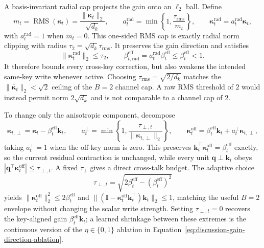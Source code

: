 \documentclass[11pt]{article}
\newcommand{\vct}[1]{\boldsymbol{#1}}
\begin{document}
A basis-invariant radial cap projects the gain onto an $\ell_2$ ball. Define
\begin{equation}
  m_t=\operatorname{RMS}(\vct{\kappa}_t)
     =\frac{\|\vct{\kappa}_t\|_2}{\sqrt{d_k}},
  \qquad
  a_t^{\mathrm{rad}}
     =\min\!\left\{1,\frac{\tau_{\mathrm{rms}}}{m_t}\right\},
  \qquad
  \vct{\kappa}_t^{\mathrm{rad}}
     =a_t^{\mathrm{rad}}\vct{\kappa}_t,
  \label{eq:discussion-radial-rms-cap}
\end{equation}
with $a_t^{\mathrm{rad}}=1$ when $m_t=0$. This one-sided RMS cap is exactly radial norm clipping
with radius $\tau_2=\sqrt{d_k}\tau_{\mathrm{rms}}$. It preserves the gain direction and satisfies
\begin{equation}
  \|\vct{\kappa}_t^{\mathrm{rad}}\|_2\leq\tau_2,
  \qquad
  \beta_{t,\mathrm{rad}}^{\mathrm{eff}}
    =a_t^{\mathrm{rad}}\beta_t^{\mathrm{eff}}
    \leq\beta_t^{\mathrm{eff}}<1.
  \label{eq:discussion-radial-rms-guarantees}
\end{equation}
It therefore bounds every cross-key correction, but also weakens the intended same-key write
whenever active. Choosing $\tau_{\mathrm{rms}}=\sqrt{2/d_k}$ matches the
$\|\overline{\vct{\kappa}}_t\|_2<\sqrt{2}$ ceiling of the $B=2$ channel cap. A raw RMS threshold
of $2$ would instead permit norm $2\sqrt{d_k}$ and is not comparable to a channel cap of $2$.

To change only the anisotropic component, decompose
\begin{equation}
  \vct{\kappa}_{t,\perp}
    =\vct{\kappa}_t-\beta_t^{\mathrm{eff}}\vct{k}_t,
  \qquad
  a_t^\perp
    =\min\!\left\{1,
      \frac{\tau_{\perp,t}}{\|\vct{\kappa}_{t,\perp}\|_2}\right\},
  \qquad
  \vct{\kappa}_t^{\mathrm{off}}
    =\beta_t^{\mathrm{eff}}\vct{k}_t
     +a_t^\perp\vct{\kappa}_{t,\perp},
  \label{eq:discussion-off-key-gain-cap}
\end{equation}
taking $a_t^\perp=1$ when the off-key norm is zero. This preserves
$\vct{k}_t^\top\vct{\kappa}_t^{\mathrm{off}}=\beta_t^{\mathrm{eff}}$ exactly, so the current
residual contraction is unchanged, while every unit
$\vct{q}\perp\vct{k}_t$ obeys
$|\vct{q}^\top\vct{\kappa}_t^{\mathrm{off}}|\leq\tau_{\perp,t}$.
A fixed $\tau_\perp$ gives a direct cross-talk budget. The adaptive choice
\begin{equation}
  \tau_{\perp,t}
    =\sqrt{2\beta_t^{\mathrm{eff}}
           -(\beta_t^{\mathrm{eff}})^2}
  \label{eq:discussion-off-key-adaptive-radius}
\end{equation}
yields
$\|\vct{\kappa}_t^{\mathrm{off}}\|_2^2
  \leq2\beta_t^{\mathrm{eff}}$ and
$\|(\vct{I}-\vct{\kappa}_t^{\mathrm{off}}\vct{k}_t^\top)\vct{k}_t\|_2\leq1$,
matching the useful $B=2$ envelope without changing the scalar write strength. Setting
$\tau_{\perp,t}=0$ recovers the key-aligned gain
$\beta_t^{\mathrm{eff}}\vct{k}_t$; a learned shrinkage between these extremes is the continuous
version of the $\eta\in\{0,1\}$ ablation in
Equation~\eqref{eq:discussion-gain-direction-ablation}.
\end{document}
